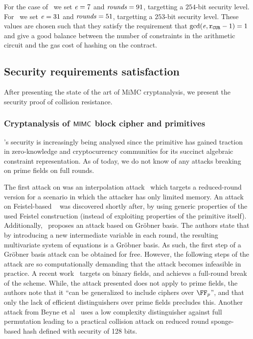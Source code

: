 For the case of \BNCurve~we set $\mathit{e}{} = 7$ and $\mathit{rounds}{} = 91$, targetting a $254$-bit security level. For \BLSCurve~we set $\mathit{e}{} = 31$ and $\mathit{rounds}{} = 51$, targetting a $253$-bit security level. These values are chosen such that they satisfy the requirement that $\gcd(\mathit{e}{},\mathtt{r_{CUR}} - 1) = 1$ and give a good balance between the number of constraints in the arithmetic circuit and the gas cost of hashing on the contract.

\subsection{Security requirements satisfaction}\label{instantiation:mkhash:security}

After presenting the state of the art of MiMC cryptanalysis, we present the security proof of \mimcMPPrime{} collision resistance.

\subsubsection{Cryptanalysis of $\mathsf{MIMC{}}$ block cipher and primitives}\label{instantiation:mkhash:security:cryptanalysis}

\mimc{}'s security is increasingly being analysed since the primitive has gained traction in zero-knowledge and cryptocurrency communities for its succinct algebraic constraint representation. As of today, we do not know of any attacks breaking \mimc{} on prime fields on full rounds.

The first attack on \mimc{} was an interpolation attack~\cite{li2019improved} which targets a reduced-round version for a scenario in which the attacker has only limited memory.
An attack on Feistel-based \mimc{}~\cite{bonnetain2019collisions} was discovered shortly after, by using generic properties of the used Feistel construction (instead of exploiting properties of the primitive itself).
Additionally,~\cite{albrecht2019algebraic} proposes an attack based on Gr\"{o}bner basis. The authors state that by introducing a new intermediate variable in each round, the resulting multivariate system of equations is a Gr\"{o}bner basis. As such, the first step of a Gr\"{o}bner basis attack can be obtained for free. However, the following steps of the attack are so computationally demanding that the attack becomes infeasible in practice.
A recent work~\cite{DBLP:conf/asiacrypt/Eichlseder0LORS20} targets \mimc{} on binary fields, and achieves a full-round break of the scheme. While, the attack presented does not apply to prime fields, the authors note that it ``can be generalized to include ciphers over $\FFx{p}$'', and that only the lack of efficient distinguishers over prime fields precludes this.
Another attack from Beyne et al~\cite{cryptoeprint:2020:188} uses a low complexity distinguisher against full \mimc{} permutation leading to a practical collision attack on reduced round sponge-based \mimc{} hash defined with security of 128 bits.

